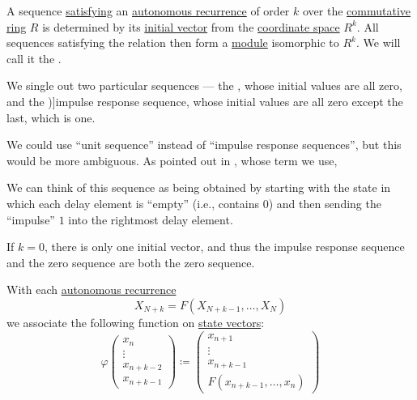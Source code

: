 \begin{definition}\label{def:recurrence_relation_space}\mimprovised
  A sequence \hyperref[def:recurrence_relation/sequence]{satisfying} an \hyperref[def:recurrence_relation]{autonomous recurrence} of order \( k \) over the \hyperref[def:ring/commutative]{commutative ring} \( R \) is determined by its \hyperref[def:recurrence_relation/state]{initial vector} from the \hyperref[def:coordinate_space]{coordinate space} \( R^k \). All sequences satisfying the relation then form a \hyperref[def:module]{module} isomorphic to \( R^k \). We will call it the .

  We single out two particular sequences --- the , whose initial values are all zero, and the \term[en=impulse response sequence (\cite[402]{LidlNiederreiter1997FiniteFields})]{impulse response sequence}, whose initial values are all zero except the last, which is one.
\end{definition}
\begin{comments}
  \item We could use \enquote{unit sequence} instead of \enquote{impulse response sequences}, but this would be more ambiguous. As pointed out in \cite[402]{LidlNiederreiter1997FiniteFields}, whose term we use,
  \begin{displayquote}
    We can think of this sequence as being obtained by starting with the state in which each delay element is \enquote{empty} (i.e., contains
\( 0 \)) and then sending the \enquote{impulse} \( 1 \) into the rightmost delay element.
  \end{displayquote}

  \item If \( k = 0 \), there is only one initial vector, and thus the impulse response sequence and the zero sequence are both the zero sequence.
\end{comments}

\begin{definition}\label{def:autonomous_recurrence_associated_function}\mimprovised
  With each \hyperref[def:recurrence_relation/autonomous]{autonomous recurrence}
  \begin{equation*}
    X_{N+k} = F(X_{N+k-1}, \ldots, X_N)
  \end{equation*}
  we associate the following function on \hyperref[def:recurrence_relation/state]{state vectors}:
  \begin{equation}\label{eq:def:autonomous_recurrence_associated_function}
    \varphi
    \begin{pmatrix}
      x_n \\
      \vdots \\
      x_{n+k-2} \\
      x_{n+k-1}
    \end{pmatrix}
    \coloneqq
    \begin{pmatrix}
      x_{n+1} \\
      \vdots \\
      x_{n+k-1} \\
      F(x_{n+k-1}, \ldots, x_n)
    \end{pmatrix}
  \end{equation}
\end{definition}

